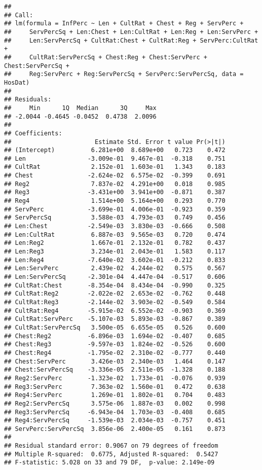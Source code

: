 \documentclass[]{article}
\begin{document}
\begin{verbatim}
## 
## Call:
## lm(formula = InfPerc ~ Len + CultRat + Chest + Reg + ServPerc + 
##     ServPercSq + Len:Chest + Len:CultRat + Len:Reg + Len:ServPerc + 
##     Len:ServPercSq + CultRat:Chest + CultRat:Reg + ServPerc:CultRat + 
##     CultRat:ServPercSq + Chest:Reg + Chest:ServPerc + Chest:ServPercSq + 
##     Reg:ServPerc + Reg:ServPercSq + ServPerc:ServPercSq, data = HosDat)
## 
## Residuals:
##     Min      1Q  Median      3Q     Max 
## -2.0044 -0.4645 -0.0452  0.4738  2.0096 
## 
## Coefficients:
##                       Estimate Std. Error t value Pr(>|t|)
## (Intercept)          6.281e+00  8.689e+00   0.723    0.472
## Len                 -3.009e-01  9.467e-01  -0.318    0.751
## CultRat              2.152e-01  1.603e-01   1.343    0.183
## Chest               -2.624e-02  6.575e-02  -0.399    0.691
## Reg2                 7.837e-02  4.291e+00   0.018    0.985
## Reg3                -3.431e+00  3.941e+00  -0.871    0.387
## Reg4                 1.514e+00  5.164e+00   0.293    0.770
## ServPerc            -3.699e-01  4.006e-01  -0.923    0.359
## ServPercSq           3.588e-03  4.793e-03   0.749    0.456
## Len:Chest           -2.549e-03  3.830e-03  -0.666    0.508
## Len:CultRat          6.887e-03  9.565e-03   0.720    0.474
## Len:Reg2             1.667e-01  2.132e-01   0.782    0.437
## Len:Reg3             3.234e-01  2.043e-01   1.583    0.117
## Len:Reg4            -7.640e-02  3.602e-01  -0.212    0.833
## Len:ServPerc         2.439e-02  4.244e-02   0.575    0.567
## Len:ServPercSq      -2.301e-04  4.447e-04  -0.517    0.606
## CultRat:Chest       -8.354e-04  8.434e-04  -0.990    0.325
## CultRat:Reg2        -2.022e-02  2.653e-02  -0.762    0.448
## CultRat:Reg3        -2.144e-02  3.903e-02  -0.549    0.584
## CultRat:Reg4        -5.915e-02  6.552e-02  -0.903    0.369
## CultRat:ServPerc    -5.107e-03  5.893e-03  -0.867    0.389
## CultRat:ServPercSq   3.500e-05  6.655e-05   0.526    0.600
## Chest:Reg2          -6.896e-03  1.694e-02  -0.407    0.685
## Chest:Reg3          -9.597e-03  1.824e-02  -0.526    0.600
## Chest:Reg4          -1.795e-02  2.310e-02  -0.777    0.440
## Chest:ServPerc       3.426e-03  2.340e-03   1.464    0.147
## Chest:ServPercSq    -3.336e-05  2.511e-05  -1.328    0.188
## Reg2:ServPerc       -1.323e-02  1.733e-01  -0.076    0.939
## Reg3:ServPerc        7.363e-02  1.560e-01   0.472    0.638
## Reg4:ServPerc        1.269e-01  1.802e-01   0.704    0.483
## Reg2:ServPercSq      3.575e-06  1.887e-03   0.002    0.998
## Reg3:ServPercSq     -6.943e-04  1.703e-03  -0.408    0.685
## Reg4:ServPercSq     -1.539e-03  2.034e-03  -0.757    0.451
## ServPerc:ServPercSq  3.856e-06  2.400e-05   0.161    0.873
## 
## Residual standard error: 0.9067 on 79 degrees of freedom
## Multiple R-squared:  0.6775, Adjusted R-squared:  0.5427 
## F-statistic: 5.028 on 33 and 79 DF,  p-value: 2.149e-09
\end{verbatim}
\end{document}
